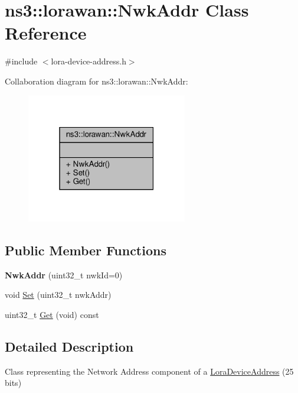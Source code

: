 \hypertarget{classns3_1_1lorawan_1_1NwkAddr}{}\section{ns3\+:\+:lorawan\+:\+:Nwk\+Addr Class Reference}
\label{classns3_1_1lorawan_1_1NwkAddr}


{\ttfamily \#include $<$lora-\/device-\/address.\+h$>$}



Collaboration diagram for ns3\+:\+:lorawan\+:\+:Nwk\+Addr\+:
\nopagebreak
\begin{figure}[H]
\begin{center}
\leavevmode
\includegraphics[width=199pt]{classns3_1_1lorawan_1_1NwkAddr__coll__graph}
\end{center}
\end{figure}
\subsection*{Public Member Functions}
\begin{DoxyCompactItemize}
\item 
\mbox{\label{classns3_1_1lorawan_1_1NwkAddr_a9a04daf4c67d4f5f972cbe35c50974bf}} 
{\bfseries Nwk\+Addr} (uint32\+\_\+t nwk\+Id=0)
\item 
void \hyperlink{classns3_1_1lorawan_1_1NwkAddr_a1ab0b879c6c8124e21c700e2be3b83b4}{Set} (uint32\+\_\+t nwk\+Addr)
\item 
uint32\+\_\+t \hyperlink{classns3_1_1lorawan_1_1NwkAddr_add27888617e928ccf58342bc15aa9d15}{Get} (void) const
\end{DoxyCompactItemize}


\subsection{Detailed Description}
Class representing the Network Address component of a \hyperlink{classns3_1_1lorawan_1_1LoraDeviceAddress}{Lora\+Device\+Address} (25 bits) 

